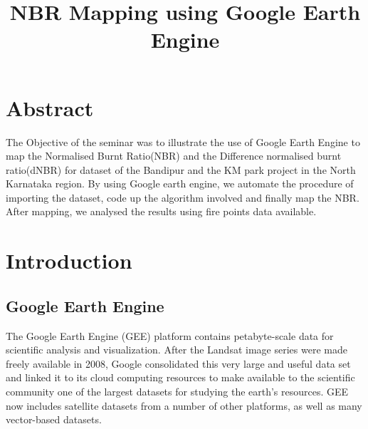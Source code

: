 \documentclass[12pt]{svproc}
\begin{document}
	


\title{NBR Mapping using Google Earth Engine}

%
\author{}


\maketitle              %
%

\section{\Large Abstract}
The Objective of the seminar was to illustrate the use of Google Earth Engine to map the Normalised Burnt Ratio(NBR) and the Difference normalised burnt ratio(dNBR) for dataset of the Bandipur and the KM park project in the North Karnataka region. By using Google earth engine, we automate the procedure of importing the dataset, code up the algorithm involved and finally map the NBR. After mapping, we analysed the results using fire points data available.

\section[60pt]{\Large Introduction}
%

\subsection{Google Earth Engine}
The Google Earth Engine (GEE) platform contains petabyte-scale data for scientific analysis and visualization. After the Landsat image series were made freely available in 2008, Google consolidated this very large and useful data set and linked it to its cloud computing resources to make available to the scientific community one of the largest datasets for studying the earth’s resources. GEE now includes satellite datasets from a number of other platforms, as well as many vector-based datasets.\\
\end{document}
